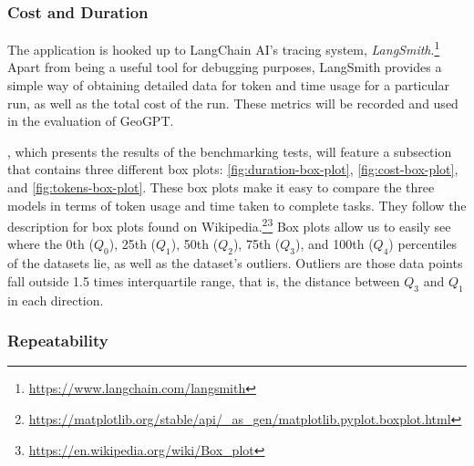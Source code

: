 \subsubsection{Cost and Duration}
\label{subsubsec:cost-and-duration}

The application is hooked up to LangChain AI's tracing system, \textit{LangSmith}.\footnote{\url{https://www.langchain.com/langsmith}} Apart from being a useful tool for debugging purposes, LangSmith provides a simple way of obtaining detailed data for token and time usage for a particular run, as well as the total cost of the run. These metrics will be recorded and used in the evaluation of GeoGPT.



, which presents the results of the benchmarking tests, will feature a subsection that contains three different box plots: \autoref{fig:duration-box-plot}, \autoref{fig:cost-box-plot}, and \autoref{fig:tokens-box-plot}. These box plots make it easy to compare the three models in terms of token usage and time taken to complete tasks. They follow the description for box plots found on Wikipedia.\footnote{\url{https://matplotlib.org/stable/api/_as_gen/matplotlib.pyplot.boxplot.html}}\footnote{\url{https://en.wikipedia.org/wiki/Box_plot}} Box plots allow us to easily see where the 0th ($Q_0$), 25th ($Q_1$), 50th ($Q_2$), 75th ($Q_3$), and 100th ($Q_4$) percentiles of the datasets lie, as well as the dataset's outliers. Outliers are those data points fall outside 1.5 times interquartile range, that is, the distance between $Q_3$ and $Q_1$ in each direction.


\subsubsection{Repeatability}
\label{subsubsec:repeatability}

